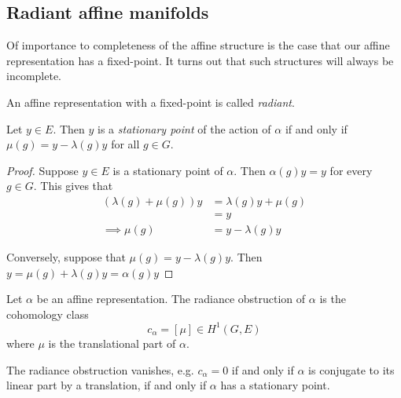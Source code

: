\subsection{Radiant affine manifolds}
Of importance to completeness of the affine structure is the case that our
affine representation has a fixed-point. It turns out that such structures will
always be incomplete.
\begin{definition}
    An affine representation with a fixed-point is called \textit{radiant}.
\end{definition}
\begin{prop}
    Let $y\in E$. Then $y$ is a \textit{stationary point} of the action of $\alpha$ if
    and only if $\mu(g) = y - \lambda(g)y$ for all $g \in G$.
    \label{prop:ary-point}\label{lemma:stationary}
\end{prop}

\begin{proof}
    Suppose $y \in E$ is a stationary point of $\alpha$. Then $\alpha(g)y = y$ for every $g \in G$.
    This gives that
    \begin{align*}
        (\lambda(g) + \mu(g))y & = \lambda(g)y + \mu(g) \\
                               & = y                    \\
        \implies \mu(g)        & = y - \lambda(g)y
    \end{align*}

    Conversely, suppose that $\mu(g) = y - \lambda(g)y$. Then $y = \mu(g) +
        \lambda(g)y = \alpha(g)y$
\end{proof}

\begin{definition}
    Let $\alpha$ be an affine representation. The radiance obstruction of $\alpha$ is the cohomology
    class
    $$
        c_{\alpha} = [\mu] \in H^1(G, E)
    $$
    where $\mu$ is the translational part of $\alpha$.
\end{definition}

\begin{lemma} \label{lemma:radiance-obstruction}
    The radiance obstruction vanishes, e.g. $c_{\alpha} = 0$ if and only if
    $\alpha$ is conjugate to its linear part by a translation, if and only if $\alpha$
    has a stationary point.
\end{lemma}

